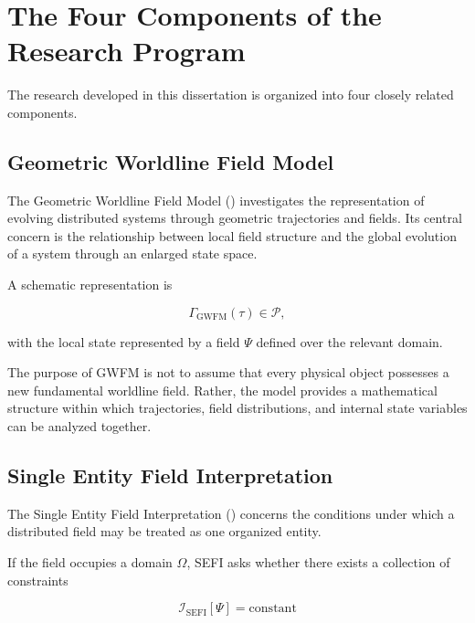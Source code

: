\documentclass[12pt,oneside]{book}
\newcommand{\GWFM}{\mathrm{GWFM}}
\newcommand{\SEFI}{\mathrm{SEFI}}
\begin{document}

\section{The Four Components of the Research Program}
\label{sec:four-components}

The research developed in this dissertation is organized into
four closely related components.

\subsection{Geometric Worldline Field Model}

The Geometric Worldline Field Model (\GWFM) investigates the
representation of evolving distributed systems through
geometric trajectories and fields. Its central concern is the
relationship between local field structure and the global
evolution of a system through an enlarged state space.

A schematic representation is

\begin{equation}
    \Gamma_{\GWFM}(\tau)
    \in
    \mathcal{P},
    \label{eq:gwfm-trajectory}
\end{equation}

with the local state represented by a field \(\Psi\) defined
over the relevant domain.

The purpose of GWFM is not to assume that every physical object
possesses a new fundamental worldline field. Rather, the model
provides a mathematical structure within which trajectories,
field distributions, and internal state variables can be
analyzed together.

\subsection{Single Entity Field Interpretation}

The Single Entity Field Interpretation (\SEFI) concerns the
conditions under which a distributed field may be treated as
one organized entity.

If the field occupies a domain \(\Omega\), SEFI asks whether
there exists a collection of constraints

\begin{equation}
    \mathcal{I}_{\SEFI}[\Psi]
    =
    \mathrm{constant}
\end{equation}
\end{document}
